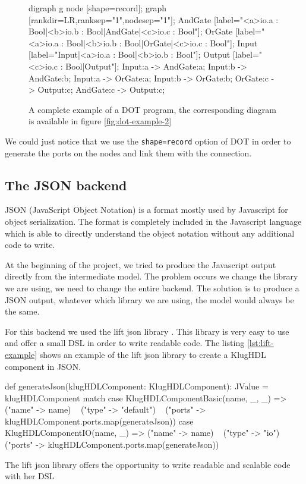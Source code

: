 \begin{figure}[H]
  \centering
  \begin{textcode}
    digraph g {
      node [shape=record];
      graph [rankdir=LR,ranksep="1",nodesep="1"];
      AndGate [label="{{<a>io.a : Bool|<b>io.b : Bool}|AndGate|{<c>io.c : Bool}}"];
      OrGate [label="{{<a>io.a : Bool|<b>io.b : Bool}|OrGate|{<c>io.c : Bool}}"];
      Input [label="{Input|{<a>io.a : Bool|<b>io.b : Bool}}"];
      Output [label="{{<c>io.c : Bool}|Output}"];
      Input:a -> AndGate:a;      Input:b -> AndGate:b;
      Input:a -> OrGate:a;       Input:b -> OrGate:b;
      OrGate:c -> Output:c;      AndGate:c -> Output:c;
    }
  \end{textcode}
  \caption[Example of a Graphviz program]{A complete example of a DOT program,
    the corresponding diagram is available in figure \ref{fig:dot-example-2}}
  \label{lst:dot-example-2}
\end{figure}

We could just notice that we use the \verb|shape=record| option of DOT in order
to generate the ports on the nodes and link them with the connection.

\subsection{The JSON backend}
\label{sec:json-backend}

JSON (JavaScript Object Notation) is a format mostly used by Javascript for
object serialization. The format is completely included in the Javascript
language which is able to directly understand the object notation without any
additional code to write.

At the beginning of the project, we tried to produce the Javascript
output directly from the intermediate model. The problem occurs we change
the library we are using, we need to change the entire backend. The solution is
to produce a JSON output, whatever which library we are using, the model would
always be the same.

For this backend we used the lift json library \cite{liftweb}. This library is
very easy to use and offer a small DSL in order to write readable code. The
listing \ref{lst:lift-example} shows an example of the lift json library to create a
KlugHDL component in JSON.

\begin{listing}[H]
  \centering
  \begin{scalacode}
  def generateJson(klugHDLComponent: KlugHDLComponent): JValue = klugHDLComponent match {
    case KlugHDLComponentBasic(name, _, _) =>
      ("name" -> name) ~
      ("type" -> "default") ~
      ("ports" -> klugHDLComponent.ports.map(generateJson))
    case KlugHDLComponentIO(name, _) =>
      ("name" -> name) ~
      ("type" -> "io") ~
      ("ports" -> klugHDLComponent.ports.map(generateJson))
  }
  \end{scalacode}
  \caption[Lift library example : a json DSL]{The lift json library offers the
    opportunity to write readable and scalable code with her DSL}
  \label{lst:lift-example}
\end{listing}

